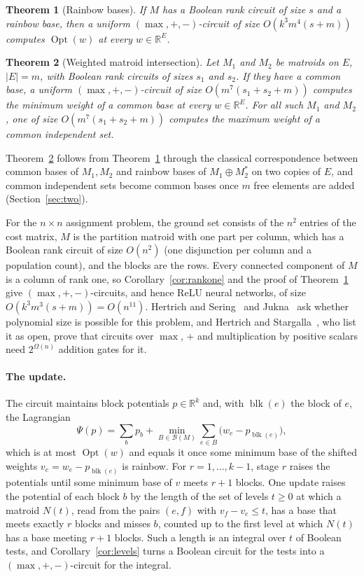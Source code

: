 \documentclass[11pt]{article}
\newtheorem{mainthm}{Theorem}
\newcommand{\R}{\mathbb R}
\newcommand{\Opt}{\operatorname{Opt}}
\newcommand{\blk}{\operatorname{blk}}
\newcommand{\Bases}{\mathcal B}
\begin{document}
\begin{mainthm}[Rainbow bases]
\label{thm:C}
If $M$ has a Boolean rank circuit of size $s$ and a rainbow base, then a uniform
$(\max,+,-)$-circuit of size $O(k^{3}m^{4}(s+m))$ computes $\Opt(w)$ at every
$w\in\R^{E}$.
\end{mainthm}

\begin{mainthm}[Weighted matroid intersection]
\label{thm:D}
Let $M_1$ and $M_2$ be matroids on $E$, $|E|=m$, with Boolean rank circuits of
sizes $s_1$ and $s_2$.  If they have a common base, a uniform $(\max,+,-)$-circuit of size $O(m^{7}(s_1+s_2+m))$ computes the minimum weight of a common base
at every $w\in\R^{E}$.  For all such $M_1$ and $M_2$, one of size $O(m^{7}(s_1+s_2+m))$ computes
the maximum weight of a common independent set.
\end{mainthm}

Theorem~\ref{thm:D} follows from Theorem~\ref{thm:C} through the classical
correspondence between common bases of $M_1,M_2$ and rainbow bases of
$M_1\oplus M_2^{*}$ on two copies of $E$, and common independent sets become
common bases once $m$ free elements are added (Section~\ref{sec:two}).

For the $n\times n$ assignment problem, the ground set consists of the $n^{2}$
entries of the cost matrix, $M$ is the partition matroid with one part per
column, which has a Boolean rank circuit of size $O(n^{2})$ (one disjunction per
column and a population count), and the blocks are the rows.  Every connected
component of $M$ is a column of rank one, so Corollary~\ref{cor:rankone} and the
proof of Theorem~\ref{thm:C} give $(\max,+,-)$-circuits, and hence ReLU neural
networks, of size $O(k^{3}m^{3}(s+m))=O(n^{11})$.  Hertrich and
Sering~\cite{hertrich-sering25} and
Jukna~\cite[Section~6.5, Problem~3]{jukna23-tropical} ask whether polynomial
size is possible for this problem, and Hertrich and
Stargalla~\cite{hertrich-stargalla26}, who list it as open, prove that circuits
over $\max$, $+$ and multiplication by positive scalars need $2^{\Omega(n)}$
addition gates for it.

\paragraph{The update.}
The circuit maintains block potentials $p\in\R^{k}$ and, with $\blk(e)$ the block
of $e$, the Lagrangian
\[
  \Psi(p)=\sum_{b}p_b+\min_{B\in\Bases(M)}\sum_{e\in B}\bigl(w_e-p_{\blk(e)}\bigr),
\]
which is at most $\Opt(w)$ and equals it once some minimum base of the shifted
weights $v_e=w_e-p_{\blk(e)}$ is rainbow.  For $r=1,\ldots,k-1$,
stage $r$ raises the potentials until some minimum base of $v$ meets $r+1$
blocks.  One update raises the potential of each block $b$ by the length of the
set of levels $t\ge0$ at which a matroid $N(t)$, read from the pairs $(e,f)$ with
$v_f-v_e\le t$, has a base that meets exactly $r$ blocks and misses
$b$, counted up to the first level at which $N(t)$ has a base meeting $r+1$
blocks.  Such a length is an integral over $t$ of Boolean tests, and
Corollary~\ref{cor:levels} turns a Boolean circuit for the tests into a
$(\max,+,-)$-circuit for the integral.
\end{document}
